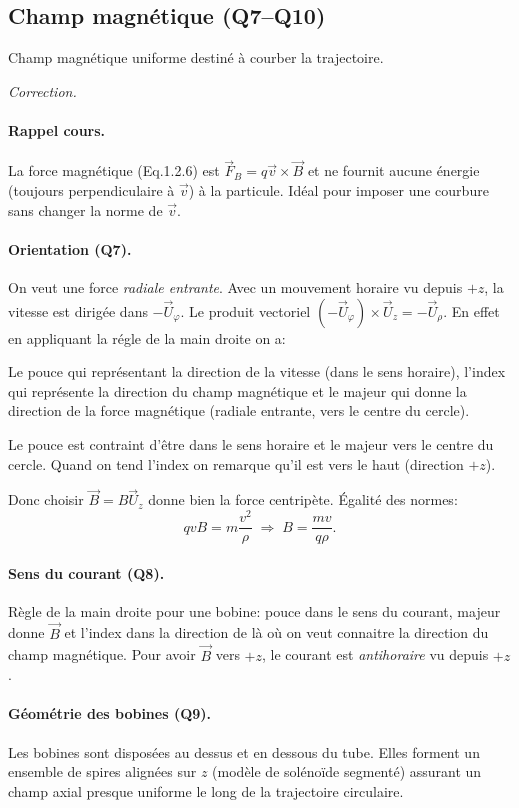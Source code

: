 \documentclass[11pt,a4paper]{article}
\newenvironment{correction}{
    \par\begingroup
    \color{blue!60!black}
    \smallskip\noindent\textit{Correction.}\quad
}{\par\medskip\endgroup}
\begin{document}
\subsection*{Champ magnétique (Q7--Q10)}
Champ magnétique uniforme destiné à courber la trajectoire.
\begin{correction}
\paragraph{Rappel cours.} La force magnétique (Eq.1.2.6) est $\vec F_B = q\vec v\times \vec B$ et ne fournit aucune énergie (toujours perpendiculaire à $\vec v$) à la particule. Idéal pour imposer une courbure sans changer la norme de $\vec v$.

\paragraph{Orientation (Q7).} On veut une force \emph{radiale entrante}. Avec un mouvement horaire vu depuis $+z$, la vitesse est dirigée dans $-\vec U_{\varphi}$. Le produit vectoriel $(-\vec U_{\varphi})\times \vec U_z = -\vec U_{\rho}$. En effet en appliquant la régle de la main droite on a:

Le pouce qui représentant la direction de la vitesse (dans le sens horaire), l'index qui représente la direction du champ magnétique et le majeur qui donne la direction de la force magnétique (radiale entrante, vers le centre du cercle).

Le pouce est contraint d'être dans le sens horaire et le majeur vers le centre du cercle. Quand on tend l'index on remarque qu'il est vers le haut (direction $+z$).

Donc choisir $\vec B = B\vec U_{z}$ donne bien la force centripète. Égalité des normes:
\[
qvB = m\frac{v^{2}}{\rho} \;\Longrightarrow\; \boxed{B = \frac{mv}{q\rho}}.
\]

\paragraph{Sens du courant (Q8).} Règle de la main droite pour une bobine: pouce dans le sens du courant, majeur donne $\vec B$ et l'index dans la direction de là où on veut connaitre la direction du champ magnétique. Pour avoir $\vec B$ vers $+z$, le courant est \emph{antihoraire} vu depuis $+z$.

\paragraph{Géométrie des bobines (Q9).} Les bobines sont disposées au dessus et en dessous du tube. Elles forment un ensemble de spires alignées sur $z$ (modèle de solénoïde segmenté) assurant un champ axial presque uniforme le long de la trajectoire circulaire.


\end{correction}
\end{document}
